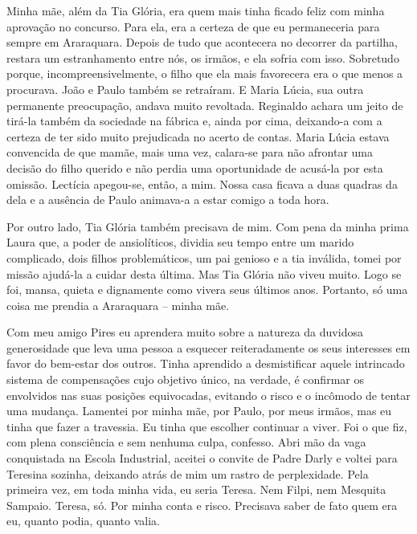 Minha mãe, além da Tia Glória, era quem mais tinha ficado feliz com minha aprovação no concurso.
Para ela, era a certeza de que eu permaneceria para sempre em Araraquara.
Depois de tudo que acontecera no decorrer da partilha, restara um estranhamento entre nós, os irmãos, e ela sofria com isso.
Sobretudo porque, incompreensivelmente, o filho que ela mais favorecera era o que menos a procurava.
João e Paulo também se retraíram.
E Maria Lúcia, sua outra permanente preocupação, andava muito revoltada.
Reginaldo achara um jeito de tirá-la também da sociedade na fábrica e, ainda por cima, deixando-a com a certeza de ter sido muito prejudicada no acerto de contas.
Maria Lúcia estava convencida de que mamãe, mais uma vez, calara-se para não afrontar uma decisão do filho querido e não perdia uma oportunidade de acusá-la por esta omissão.
Lectícia apegou-se, então, a mim.
Nossa casa ficava a duas quadras da dela e a ausência de Paulo animava-a a estar comigo a toda hora.


Por outro lado, Tia Glória também precisava de mim.
Com pena da minha prima Laura que, a poder de ansiolíticos, dividia seu tempo entre um marido complicado, dois filhos problemáticos, um pai genioso e a tia inválida, tomei por missão ajudá-la a cuidar desta última.
Mas Tia Glória não viveu muito.
Logo se foi, mansa, quieta e dignamente como vivera seus últimos anos.
Portanto, só uma coisa me prendia a Araraquara -- minha mãe.

Com meu amigo Pires eu aprendera muito sobre a natureza da duvidosa generosidade que leva uma pessoa a esquecer reiteradamente os seus interesses em favor do bem-estar dos outros.
Tinha aprendido a desmistificar aquele intrincado sistema de compensações cujo objetivo único, na verdade, é confirmar os envolvidos nas suas posições equivocadas, evitando o risco e o incômodo de tentar uma mudança.
Lamentei por minha mãe, por Paulo, por meus irmãos, mas eu tinha que fazer a travessia.
Eu tinha que escolher continuar a viver.
Foi o que fiz, com plena consciência e sem nenhuma culpa, confesso.
Abri mão da vaga conquistada na Escola Industrial, aceitei o convite de Padre Darly e voltei para Teresina sozinha, deixando atrás de mim um rastro de perplexidade.
Pela primeira vez, em toda minha vida, eu seria Teresa.
Nem Filpi, nem Mesquita Sampaio.
Teresa, só.
Por minha conta e risco.
Precisava saber de fato quem era eu, quanto podia, quanto valia.
